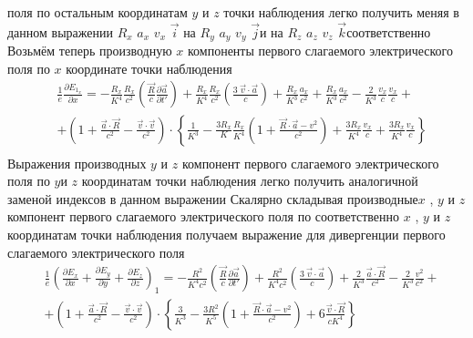 \documentclass[11pt]{article}
\begin{document}
поля по остальным координатам \(y\) и \(z\) точки наблюдения легко
получить меняя в данном выражении \({{R}_{x}}\) \({{a}_{x}}\)
\({{v}_{x}}\) \(\overrightarrow{i}\) на \({{R}_{y}}\) \({{a}_{y}}\)
\({{v}_{y}}\) \(\overrightarrow{j}\)и на \({{R}_{z}}\) \({{a}_{z}}\)
\({{v}_{z}}\) \(\overrightarrow{k}\)соответственно Возьмём теперь
производную \(x\) компоненты первого слагаемого электрического поля по
\(x\) координате точки наблюдения \[\begin{align}
  & \frac{1}{e}\frac{\partial {{E}_{{{1}_{x}}}}}{\partial x}=-\frac{{{R}_{x}}}{{{K}^{4}}}\frac{{{R}_{x}}}{{{c}^{2}}}\left( \frac{\overrightarrow{R}}{c}\frac{\partial \overrightarrow{a}}{\partial t'} \right)+\frac{{{R}_{x}}}{{{K}^{4}}}\frac{{{R}_{x}}}{{{c}^{2}}}\left( \frac{3\ \overrightarrow{v}\cdot \overrightarrow{a}}{c} \right)+\frac{{{R}_{x}}}{{{K}^{3}}}\frac{{{a}_{x}}}{{{c}^{2}}}+\frac{{{R}_{x}}}{{{K}^{3}}}\frac{{{a}_{x}}}{{{c}^{2}}}-\frac{2}{{{K}^{3}}}\frac{{{v}_{x}}}{c}\frac{{{v}_{x}}}{c}+ \\
 & +\left( 1+\frac{\overrightarrow{a}\cdot \overrightarrow{R}}{{{c}^{2}}}-\frac{\overrightarrow{v}\cdot \overrightarrow{v}}{{{c}^{2}}} \right)\cdot \left\{ \frac{1}{{{K}^{3}}}-\frac{3{{R}_{x}}}{K}\frac{{{R}_{x}}}{{{K}^{4}}}\left( 1+\frac{\overrightarrow{R}\cdot \overrightarrow{a}-{{v}^{2}}}{{{c}^{2}}} \right)+\frac{3{{R}_{x}}}{{{K}^{4}}}\frac{{{v}_{x}}}{c}+\frac{3{{R}_{x}}}{{{K}^{4}}}\frac{{{v}_{x}}}{c} \right\} \\
\end{align}\] Выражения производных \(y\) и \(z\) компонент первого
слагаемого электрического поля по \(y\)и \(z\) координатам точки
наблюдения легко получить аналогичной заменой индексов в данном
выражении Скалярно складывая производные\(x\) , \(y\) и \(z\)компонент
первого слагаемого электрического поля по соответственно \(x\) , \(y\) и
\(z\)координатам точки наблюдения получаем выражение для дивергенции
первого слагаемого электрического поля \[\begin{align}
  & \frac{1}{e}{{\left( \frac{\partial {{E}_{x}}}{\partial x}+\frac{\partial {{E}_{y}}}{\partial y}+\frac{\partial {{E}_{z}}}{\partial z} \right)}_{1}}=-\frac{{{R}^{2}}}{{{K}^{4}}{{c}^{2}}}\left( \frac{\overrightarrow{R}}{c}\frac{\partial \overrightarrow{a}}{\partial t'} \right)+\frac{{{R}^{2}}}{{{K}^{4}}{{c}^{2}}}\left( \frac{3\ \overrightarrow{v}\cdot \overrightarrow{a}}{c} \right)+\frac{2}{{{K}^{3}}}\frac{\overrightarrow{a}\cdot \overrightarrow{R}}{{{c}^{2}}}-\frac{2}{{{K}^{3}}}\frac{{{v}^{2}}}{{{c}^{2}}}+ \\
 & +\left( 1+\frac{\overrightarrow{a}\cdot \overrightarrow{R}}{{{c}^{2}}}-\frac{\overrightarrow{v}\cdot \overrightarrow{v}}{{{c}^{2}}} \right)\cdot \left\{ \frac{3}{{{K}^{3}}}-\frac{3{{R}^{2}}}{{{K}^{5}}}\left( 1+\frac{\overrightarrow{R}\cdot \overrightarrow{a}-{{v}^{2}}}{{{c}^{2}}} \right)+6\frac{\overrightarrow{v}\cdot \overrightarrow{R}}{c{{K}^{4}}} \right\} \\
\end{align}\]
\end{document}
